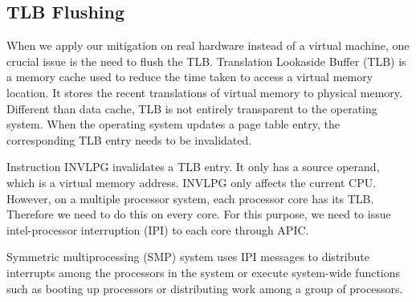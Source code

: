\subsection{TLB Flushing}
%
%
%
%



When we apply our mitigation on real hardware instead of a virtual machine, one crucial issue is the need to flush the TLB.  Translation Lookaside Buffer (TLB) is a memory cache used to reduce the time taken to access a virtual memory location. It stores the recent translations of virtual memory to physical memory. Different than data cache, TLB is not entirely transparent to the operating system. When the operating system updates a page table entry, the corresponding TLB entry needs to be invalidated.

Instruction INVLPG invalidates a TLB entry. It only has a source operand, which is a virtual memory address. INVLPG only affects the current CPU. However, on a multiple processor system, each processor core has its TLB. Therefore we need to do this on every core. For this purpose, we need to issue intel-processor interruption (IPI) to each core through APIC. 

Symmetric multiprocessing (SMP) system uses IPI messages to distribute interrupts among the processors in the system or execute system-wide functions such as booting up processors or distributing work among a group of processors. 


